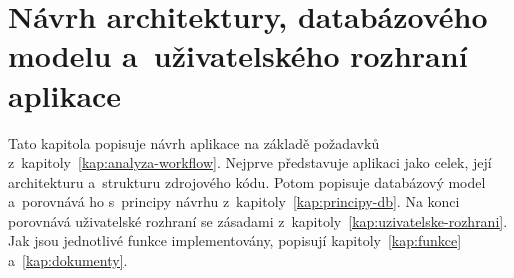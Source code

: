 \chapter{Návrh architektury, databázového modelu a~uživatelského rozhraní aplikace}\label{kap:architektura}

Tato kapitola popisuje návrh aplikace na základě požadavků z~kapitoly~\ref{kap:analyza-workflow}. Nejprve představuje aplikaci jako celek, její architekturu a~strukturu zdrojového kódu. Potom popisuje databázový model a~porovnává ho s~principy návrhu z~kapitoly~\ref{kap:principy-db}. Na konci porovnává uživatelské rozhraní se zásadami z~kapitoly~\ref{kap:uzivatelske-rozhrani}. Jak jsou jednotlivé funkce implementovány, popisují kapitoly~\ref{kap:funkce} a~\ref{kap:dokumenty}.

\begingroup\sloppy






\endgroup
